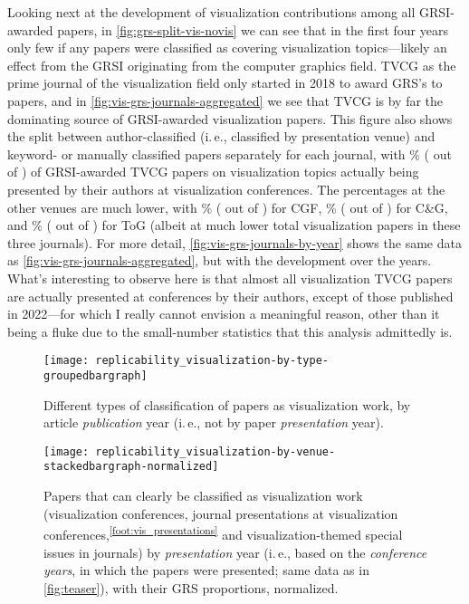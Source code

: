 \documentclass[conference]{vgtc}                     %
\newcommand{\ie}{i.\,e.}
\begin{document}
Looking next at the development of visualization contributions among all GRSI-awarded papers, in \autoref{fig:grs-split-vis-novis} we can see that in the first four years only few if any papers were classified as covering visualization topics---likely an effect from the GRSI originating from the computer graphics field. TVCG as the prime journal of the visualization field only started in 2018 to award GRS's to papers, and in \autoref{fig:vis-grs-journals-aggregated} we see that TVCG is by far the dominating source of GRSI-awarded visualization papers. This figure also shows the split between author-classified (\ie, classified by presentation venue) and keyword- or manually classified papers separately for each journal, with \GrsiVisPapersInIEEETVCGPercentagePresentation{}\% (\GrsiVisPapersInIEEETVCGPresentation{} out of \GrsiVisPapersInIEEETVCGTotal) of GRSI-awarded TVCG papers on visualization topics actually being presented by their authors at visualization conferences. The percentages at the other venues are much lower, with \GrsiVisPapersInWileyCGFPercentagePresentation{}\% (\GrsiVisPapersInWileyCGFPresentation{} out of \GrsiVisPapersInWileyCGFTotal) for CGF, \GrsiVisPapersInElsevierCaGPercentagePresentation{}\% (\GrsiVisPapersInElsevierCaGPresentation{} out of \GrsiVisPapersInElsevierCaGTotal) for C\&G, and \GrsiVisPapersInACMToGPercentagePresentation{}\% (\GrsiVisPapersInACMToGPresentation{} out of \GrsiVisPapersInACMToGTotal) for ToG (albeit at much lower total visualization papers in these three journals). For more detail, \autoref{fig:vis-grs-journals-by-year} shows the same data as \autoref{fig:vis-grs-journals-aggregated}, but with the development over the years. What's interesting to observe here is that almost all visualization TVCG papers are actually presented at conferences by their authors, except of those published in 2022---for which I really cannot envision a meaningful reason, other than it being a fluke due to the small-number statistics that this analysis admittedly is.

\begin{figure}
	\centering
	\texttt{[image: replicability\_visualization-by-type-groupedbargraph]}
	\caption{Different types of classification of papers as visualization work, by article \emph{publication} year (\ie, not by paper \emph{presentation} year).}
	\label{fig:grs-vis-classification}
\end{figure}

\begin{figure}
	\centering
	\texttt{[image: replicability\_visualization-by-venue-stackedbargraph-normalized]}
	\caption{Papers that can clearly be classified as visualization work (visualization conferences, journal presentations at visualization conferences,\textsuperscript{\ref{foot:vis_presentations}} and visualization-themed special issues in journals) by \emph{presentation} year (\ie, based on the \emph{conference years}, in which the papers were presented; same data as in \autoref{fig:teaser}), with their GRS proportions, normalized.}
	\label{fig:vis-grs-presentations-by-year}
\end{figure}
\end{document}
